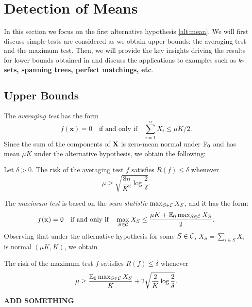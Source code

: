 \documentclass[10pt, oneside]{article}
\begin{document}
\section{Detection of Means}
In this section we focus on the first alternative hypothesis \ref{alt:mean}. We will first discuss simple tests are considered as we obtain upper bounds: the averaging test and the maximum test. Then, we will provide the key insights driving the results for lower bounds obtained in \cite{addario2010combinatorial} and discuss the applications to examples such as {\bf $k$-sets, spanning trees, perfect matchings, etc}.


\subsection{Upper Bounds}
The \textit{averaging test} has the form
\[
f(\mathbf{x}) = 0  \quad\mbox{if and only if}\quad { \sum_{i=1}^n X_i \le \mu K/2 }.
\]
Since the sum of the components of $\mathbf{X}$ is zero-mean normal under $\mathbb{P}_0$
and has mean $\mu K$ under the alternative hypothesis, we obtain the following:
\begin{prop}
  \label{average}
  Let $\delta>0$. The risk of the averaging test $f$ satisfies
  $R(f) \le\delta$
  whenever
  \[
  \mu\ge\sqrt{\frac{8n}{K^2} \log\frac{2}{\delta}}.
  \]
\end{prop}

The \textit{maximum test} is based on the \textit{scan statistic} $\max_{S\in{\mathcal C}} X_S$, and it has the form:
%
\[
f(\mathbf{x}) = 0 \quad\mbox{if and only if}\quad
\max_{S\in{\mathcal C}} X_S\le\frac{\mu K + \mathbb{E}_0 \max_{S\in{\mathcal C}} X_S}{2}.
\]
Observing that under the alternative hypothesis for some $S\in{\mathcal C}$, $X_S= \sum_{i\in S} X_i$ is normal
$(\mu K, K)$, we obtain
\begin{prop}
  \label{maxtest}
  The risk of the maximum test $f$ satisfies
  $R(f) \le\delta$ whenever
  \[
  \mu\ge\frac{\mathbb{E}_0 \max_{S\in{\mathcal C}} X_S}{K} + 2\sqrt{\frac{2}{K}
  \log
  \frac{2}{\delta}}.
  \]
\end{prop}

{\bf ADD SOMETHING}
\end{document}
